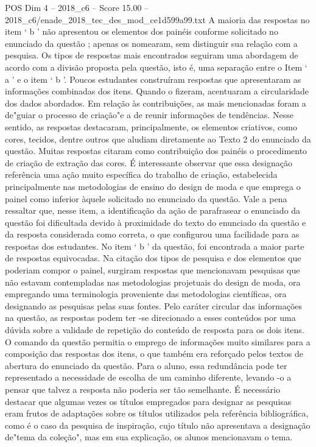 \begin{textsample}{POS Dim 4 – 2018\_c6 – Score 15.00 – 2018\_c6/enade\_2018\_tec\_des\_mod\_ce1d599a99.txt}
A maioria das respostas no item ‘ b ’ não apresentou os elementos dos painéis conforme solicitado no enunciado da questão ; apenas os nomearam, sem distinguir sua relação com a pesquisa.
Os tipos de respostas mais encontrados seguiram uma abordagem de acordo com a divisão proposta pela questão, isto é, uma separação entre o Item ‘ a ’ e o item ‘ b ’.
Poucos estudantes construíram respostas que apresentaram as informações combinadas dos itens.
Quando o fizeram, acentuaram a circularidade dos dados abordados.
Em relação às contribuições, as mais mencionadas foram a de"guiar o processo de criação"e a de reunir informações de tendências.
Nesse sentido, as respostas destacaram, principalmente, os elementos criativos, como cores, tecidos, dentre outros que aludiam diretamente ao Texto 2 do enunciado da questão.
Muitas respostas citaram como contribuição dos painéis o procedimento de criação de extração das cores.
É interessante observar que essa designação referência uma ação muito específica do trabalho de criação, estabelecida principalmente nas metodologias de ensino do design de moda e que emprega o painel como inferior àquele solicitado no enunciado da questão.
Vale a pena ressaltar que, nesse item, a identificação da ação de parafrasear o enunciado da questão foi dificultada devido à proximidade do texto do enunciado da questão e da resposta considerada como correta, o que configurou uma facilidade para as respostas dos estudantes.
No item ‘ b ’ da questão, foi encontrada a maior parte de respostas equivocadas.
Na citação dos tipos de pesquisa e dos elementos que poderiam compor o painel, surgiram respostas que mencionavam pesquisas que não estavam contempladas nas metodologias projetuais do design de moda, ora empregando uma terminologia proveniente das metodologias científicas, ora designando as pesquisas pelas suas fontes.
Pelo caráter circular das informações na questão, as respostas podem ter -se direcionado a esses conteúdos por uma dúvida sobre a validade de repetição do conteúdo de resposta para os dois itens.
O comando da questão permitia o emprego de informações muito similares para a composição das respostas dos itens, o que também era reforçado pelos textos de abertura do enunciado da questão.
Para o aluno, essa redundância pode ter representado a necessidade de escolha de um caminho diferente, levando -o a pensar que talvez a resposta não poderia ser tão semelhante.
É necessário destacar que algumas vezes os títulos empregados para designar as pesquisas eram frutos de adaptações sobre os títulos utilizados pela referência bibliográfica, como é o caso da pesquisa de inspiração, cujo título não apresentava a designação de"tema da coleção", mas em sua explicação, os alunos mencionavam o tema.

\end{textsample}
